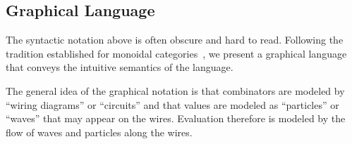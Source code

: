 \documentclass[preprint]{sigplanconf}
\newcommand{\xcomment}[2]{\textbf{#1:~\textsl{#2}}}
\newcommand{\roshan}[1]{\xcomment{Roshan}{#1}}
\newtheorem{proposition}[theorem]{Proposition}
\begin{document}



\subsection{Graphical Language}

The syntactic notation above is often obscure and hard to read.
Following the tradition established for monoidal
categories~\cite{springerlink:10.1007/978-3-642-12821-94}, we present
a graphical language that conveys the intuitive semantics of the
language.

The general idea of the graphical notation is that combinators are modeled by
``wiring diagrams'' or ``circuits'' and that values are modeled as
``particles'' or ``waves'' that may appear on the wires. Evaluation therefore
is modeled by the flow of waves and particles along the wires.

\end{document}
